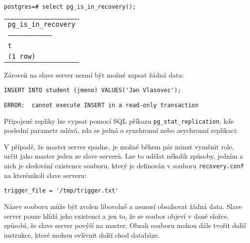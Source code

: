 \begin{lstlisting}
postgres=# select pg_is_in_recovery();
\end{lstlisting}
    \begin{table}[H]
        \begin{center}
      \label{pgHba}
          \begin{tabular}{l}
            \texttt{pg\_is\_in\_recovery}\\
            \texttt{---------------------------------}\\
            \texttt{t}\\
            \texttt{(1 row)}\\
          \end{tabular}
        \end{center}
    \end{table}

Zároveň na slave server nesmí být možné zapsat žádná data:

\begin{lstlisting}
INSERT INTO student (jmeno) VALUES('Jan Vlasovec');
\end{lstlisting}
\begin{lstlisting}[keywordstyle=\color{black},identifierstyle=\color{black},stringstyle=\color{black}]
ERROR:  cannot execute INSERT in a read-only transaction
\end{lstlisting}

Připojené repliky lze vypsat pomocí SQL příkazu \texttt{pg\_stat\_replication}, kde poslední parametr udává, zda se jedná o synchronní nebo asychronní replikaci:



V případě, že master server spadne, je možné během pár minut vyměnit role, určit jako master jeden ze slave serverů. Lze to udělat několik způsoby, jedním z nich je sledování existence souboru, který je definován v souboru \texttt{recovery.conf} na kterémkoli slave serveru:

\begin{lstlisting}
trigger_file = '/tmp/trigger.txt'
\end{lstlisting}

Název souboru může být zvolen libovolně a nemusí obsahovat žádná data. Slave server pouze hlídá jeho existenci a jen to, že se soubor objeví v dané složce, způsobí, že slave server povýší na master. Obsah souboru mohou dále tvořit další instrukce, které mohou ovlivnit další chod databáze.

